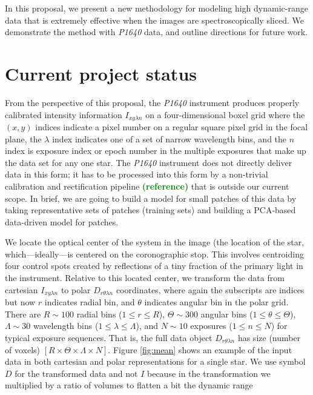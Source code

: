 \documentclass[12pt,pdftex,preprint]{aastex}
\newcommand{\project}[1]{\textsl{#1}}
\newcommand{\rob}[1]{\textbf{\textcolor{green}{#1}}}
\begin{document}
In this proposal, we present a new methodology for modeling high
dynamic-range data that is extremely effective when the images are
spectroscopically sliced.  We demonstrate the method with
\project{P1640} data, and outline directions for future work.

\section{Current project status}

From the perspective of this proposal, the \project{P1640}
instrument produces properly calibrated intensity information $I_{x y
 \lambda n}$ on a four-dimensional boxel grid where the $(x, y)$
indices indicate a pixel number on a regular square pixel grid in the
focal plane, the $\lambda$ index indicates one of a set of narrow
wavelength bins, and the $n$ index is exposure index or epoch number
in the multiple exposures that make up the data set for any one star.
The \project{P1640} instrument does not directly deliver data in this
form; it has to be processed into this form by a non-trivial
calibration and rectification pipeline \rob{(reference)} that is outside our
current scope.  In brief, we are going to build a model for small
patches of this data by taking representative sets of patches
(training sets) and building a PCA-based data-driven model for
patches.

We locate the optical center of the system in the image (the location
of the star, which---ideally---is centered on the coronographic stop.
This involves centroiding four control spots created by reflections of
a tiny fraction of the primary light in the instrument.  Relative to
this located center, we transform the data from cartesian $I_{x y
 \lambda n}$ to polar $D_{r \theta \lambda n}$ coordinates, where
again the subscripts are indices but now $r$ indicates radial bin, and
$\theta$ indicates angular bin in the polar grid.  There are $R\sim
100$ radial bins ($1\leq r\leq R$), $\Theta\sim 300$ angular bins
($1\leq\theta\leq\Theta$), $\Lambda\sim 30$ wavelength bins
($1\leq\lambda\leq\Lambda$), and $N\sim 10$ exposures ($1\leq
n\leq N$) for typical exposure sequences.  That is, the full data
object $D_{r \theta \lambda n}$ has size (number of voxels)
$[R\times\Theta\times\Lambda\times N]$.  Figure \ref{fig:mean} shows
an example of the input data in both cartesian and polar
representations for a single star. We use symbol $D$ for the
transformed data and not $I$ because in the transformation we
multiplied by a ratio of volumes to flatten a bit the dynamic range
\end{document}
